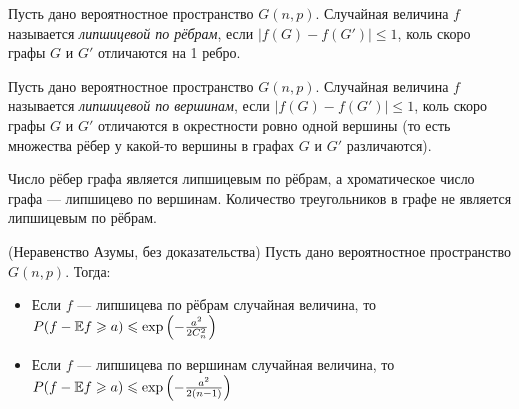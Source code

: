 \begin{definition}
Пусть дано вероятностное пространство $G(n,p)$. Случайная величина
$f$ называется \textit{липшицевой по рёбрам}, если $|f(G) - f(G')| \leq 1$, коль скоро графы $G$ и $G'$
отличаются на 1 ребро.
\end{definition}

\begin{definition}
Пусть дано вероятностное пространство $G(n,p)$. Случайная величина
$f$ называется \textit{липшицевой по вершинам}, если $|f(G) - f(G')| \leq 1$, коль скоро графы $G$ и $G'$ отличаются в окрестности ровно одной вершины (то есть множества рёбер у какой-то
вершины в графах $G$ и $G'$ различаются).
\end{definition}


\begin{note}
Число рёбер графа является липшицевым по рёбрам, а хроматическое число
графа — липшицево по вершинам. 
Количество треугольников в графе не является липшицевым по рёбрам.
\end{note}

\begin{theorem} (Неравенство Азумы, без доказательства)
	Пусть дано вероятностное пространство $G(n, p)$. Тогда:
	\begin{itemize}
		\item Если $f$ --- липшицева по рёбрам случайная величина, то \(P(f - \mathbb{E} f \geqslant a) \leqslant \exp\left(-\frac{a^2}{2C_n^2}\right)\)
		
		\item Если $f$ --- липшицева по вершинам случайная величина, то \(P(f - \mathbb{E} f \geqslant a) \leqslant \exp\left(-\frac{a^2}{2(n - 1)}\right)\)
	\end{itemize}
\end{theorem}

